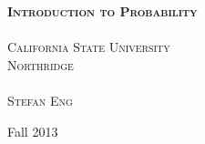 
\begin{titlepage}
\thispagestyle{empty}
\begin{center}
\textsc{\LARGE \bfseries Introduction to Probability}\\[.3cm]
\HRule \\[.5cm]
\textsc{\large California State University\\Northridge}\\
\HRule \\[1cm]
\textsc{\large Stefan Eng}
\vfill

{\large Fall 2013}

\end{center}
\end{titlepage}
